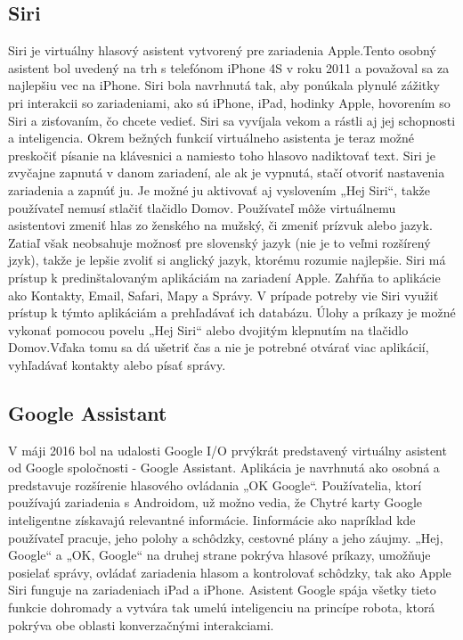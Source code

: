 \documentclass[10pt,twoside,slovak,coursepaper]{article}
\begin{document}
\subsection{Siri}
Siri je virtuálny hlasový asistent vytvorený pre zariadenia Apple.Tento osobný asistent bol uvedený na trh s telefónom iPhone 4S v roku 2011 a považoval sa za najlepšiu vec na iPhone. Siri bola navrhnutá tak, aby ponúkala plynulé zážitky pri interakcii so zariadeniami, ako sú iPhone, iPad, hodinky Apple, hovorením so Siri a zisťovaním, čo chcete vedieť.  Siri sa vyvíjala vekom a rástli aj jej schopnosti a inteligencia. Okrem bežných funkcií virtuálneho asistenta je teraz možné preskočiť písanie na klávesnici a namiesto toho hlasovo nadiktovať text. 
Siri je zvyčajne zapnutá v danom zariadení, ale ak je vypnutá, stačí otvoriť nastavenia zariadenia a zapnúť ju. Je možné ju aktivovať aj vyslovením „Hej Siri“, takže používateľ nemusí stlačiť tlačidlo Domov. Používateľ môže virtuálnemu asistentovi zmeniť hlas zo ženského na mužský, či zmeniť prízvuk alebo jazyk. Zatiaľ však neobsahuje možnosť pre slovenský jazyk (nie je to veľmi rozšírený jzyk), takže je lepšie zvoliť si anglický jazyk, ktorému rozumie najlepšie.
 Siri má prístup k predinštalovaným aplikáciám na zariadení Apple. Zahŕňa to aplikácie ako Kontakty, Email, Safari, Mapy a Správy. V prípade potreby vie Siri využiť prístup k týmto aplikáciám a prehľadávať ich databázu. Úlohy a príkazy je možné vykonať pomocou povelu „Hej Siri“ alebo dvojitým klepnutím na tlačidlo Domov.Vďaka tomu sa dá ušetriť čas a nie je potrebné otvárať viac aplikácií, vyhľadávať kontakty alebo písať správy.\cite{Strephon}

\subsection{Google Assistant}
V máji 2016 bol na udalosti Google I/O prvýkrát predstavený virtuálny asistent od Google spoločnosti - Google Assistant. Aplikácia je navrhnutá ako osobná a predstavuje rozšírenie hlasového ovládania „OK Google“. Používatelia, ktorí používajú zariadenia s Androidom, už možno vedia, že Chytré karty Google inteligentne získavajú relevantné informácie. Iinformácie ako napríklad kde používateľ pracuje, jeho polohy a schôdzky, cestovné plány a jeho záujmy.
 „Hej, Google“ a  „OK, Google“ na druhej strane pokrýva hlasové príkazy, umožňuje posielať správy, ovládať zariadenia hlasom a kontrolovať schôdzky, tak ako Apple Siri funguje na zariadeniach iPad a iPhone. Asistent Google spája všetky tieto funkcie dohromady a vytvára tak umelú inteligenciu na princípe robota, ktorá pokrýva obe oblasti konverzačnými interakciami. \cite{Strephon}
\end{document}
